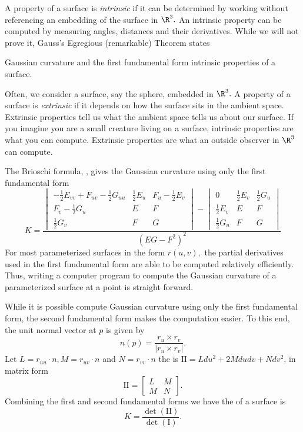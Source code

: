 A property of a surface is \emph{intrinsic} if it can be determined by working without referencing
an embedding of the surface in $\R^3.$ An intrinsic property can be computed by measuring angles,
distances and their derivatives. While we will not prove it, Gauss's Egregious (remarkable) Theorem states
\begin{theorem}
 Gaussian curvature and the first fundamental form intrinsic properties of a surface.
\end{theorem}

Often, we consider a surface, say the sphere, embedded in $\R^3.$ A property of a surface is
\emph{extrinsic} if it depends on how the surface sits in the ambient space. Extrinsic properties
tell us what the ambient space tells us about our surface. If you imagine you are a small
creature living on a surface, intrinsic properties are what you can compute. Extrinsic properties
are what an outside observer in $\R^3$ can compute.

The Brioschi formula, \cite{teo2024brioschi}, gives the Gaussian curvature using only the first fundamental form
\begin{equation}\label{eq:brioschi}
	K=\frac{\begin{vmatrix}
-\frac{1}{2}E_{vv}+F_{uv}-\frac{1}{2}G_{uu} & \frac{1}{2}E_u & F_u-\frac{1}{2}E_v\\
F_v-\frac{1}{2}G_u & E & F\\
\frac{1}{2}G_v & F & G
\end{vmatrix}-\begin{vmatrix}
0 & \frac{1}{2}E_v & \frac{1}{2}G_u\\
\frac{1}{2}E_v & E & F\\
\frac{1}{2}G_u & F & G
\end{vmatrix}}{(EG-F^2)^2}
\end{equation}
For most parameterized surfaces in the form $r(u,v),$ the partial derivatives used in the
first fundamental form are able to be computed relatively efficiently. Thus,
writing a computer program to compute the Gaussian curvature of a parameterized
surface at a point is straight forward.


While it is possible compute Gaussian curvature using only the first fundamental form,
 the second fundamental form makes the computation easier.
To this end, the unit normal vector at $p$ is given by $$n(p)=\frac{r_u\times r_v}{|r_u\times r_v|}.$$
Let $L=r_{uu}\cdot n, M=r_{uv}\cdot n$ and $N=r_{vv}\cdot n$ the
 is $\mathrm{I\!I}=Ldu^2+2Mdudv+Ndv^2$,
in matrix form $$\mathrm{I\!I}=\begin{bmatrix}
L & M \\
M & N 
\end{bmatrix}.$$
Combining the first and second fundamental forms we have
the  of a surface is
\begin{equation}\label{eqn:curve-dets}
 	K=\frac{\det(\mathrm{I\!I})}{\det(\mathrm{I})}.
\end{equation}


